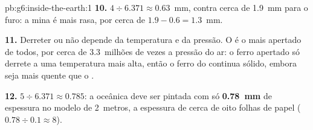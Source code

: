 \begin{solution}{pb:g6:inside-the-earth:1}
\textbf{10.} $4 \div 6.371 \approx 0.63$~mm, contra cerca de 1.9~mm para o
furo: a mina é mais rasa, por cerca de $1.9 - 0.6 = 1.3$~mm.

\textbf{11.} Derreter ou não depende da temperatura e da pressão. O  é o mais apertado de todos, por cerca de 3.3~milhões de vezes a
pressão do ar: o ferro apertado só derrete a uma temperatura mais alta,
então o ferro do  continua sólido, embora seja mais quente
que o .

\textbf{12.} $5 \div 6.371 \approx 0.785$: a  oceânica deve ser
pintada com só \textbf{0.78~mm} de espessura no modelo de 2~metros, a
espessura de cerca de oito folhas de papel ($0.78 \div 0.1 \approx 8$).
\end{solution}
